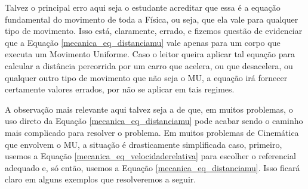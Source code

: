 Talvez o principal erro aqui seja o estudante acreditar que essa é a equação fundamental do movimento de toda a Física, ou seja, que ela vale para qualquer tipo de movimento. Isso está, claramente, errado, e fizemos questão de evidenciar que a Equação \eqref{mecanica_eq_distanciamu} vale apenas para um corpo que executa um Movimento Uniforme. Caso o leitor queira aplicar tal equação para calcular a distância percorrida por um carro que acelera, ou que desacelera, ou qualquer outro tipo de movimento que não seja o MU, a equação irá fornecer certamente valores errados, por não se aplicar em tais regimes.




A observação mais relevante aqui talvez seja a de que, em muitos problemas, o uso direto da Equação \eqref{mecanica_eq_distanciamu} pode acabar sendo o caminho mais complicado para resolver o problema. Em muitos problemas de Cinemática que envolvem o MU, a situação é drasticamente simplificada caso, primeiro, usemos a Equação \eqref{mecanica_eq_velocidaderelativa} para escolher o referencial adequado e, só então, usemos a Equação \eqref{mecanica_eq_distanciamu}. Isso ficará claro em alguns exemplos que resolveremos a seguir.





\vspace{0.3cm}


